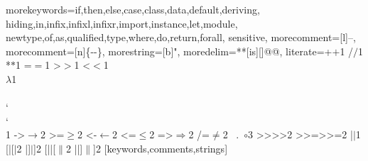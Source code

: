 \usepackage{listings}


%
  {morekeywords={if,then,else,case,class,data,default,deriving,%
      hiding,in,infix,infixl,infixr,import,instance,let,module,%
      newtype,of,as,qualified,type,where,do,return,forall},%
   sensitive,%
   morecomment=[l]--,%
   morecomment=[n]{\{-}{-\}},%
   morestring=[b]",%
  moredelim=**[is][\color{TemplateStage}]{@}{@},
   literate={+}{{$+$}}1 {/}{{$/$}}1 {*}{{$*$}}1 {=}{{$=$}}1
            {>}{{$>$}}1 {<}{{$<$}}1 {\\}{{$\lambda$}}1
            {\\\\}{{\char`\\\char`\\}}1
            {->}{{$\rightarrow$}}2 {>=}{{$\geq$}}2 {<-}{{$\leftarrow$}}2
            {<=}{{$\leq$}}2 {=>}{{$\Rightarrow$}}2 
            {/=}{{$\ne$}}2
            {\ .\ }{{$\circ$}}3
            {>>}{{>>}}2 {>>=}{{>>=}}2
            {|}{{$\mid$}}1
            {[|}{{[$|$}}2
            {|]}{{$|$]}}2
            {[||}{{[$\|$}}2
            {||]}{{$\|$]}}2
  }[keywords,comments,strings]%
\lstset{language=Haskell}



